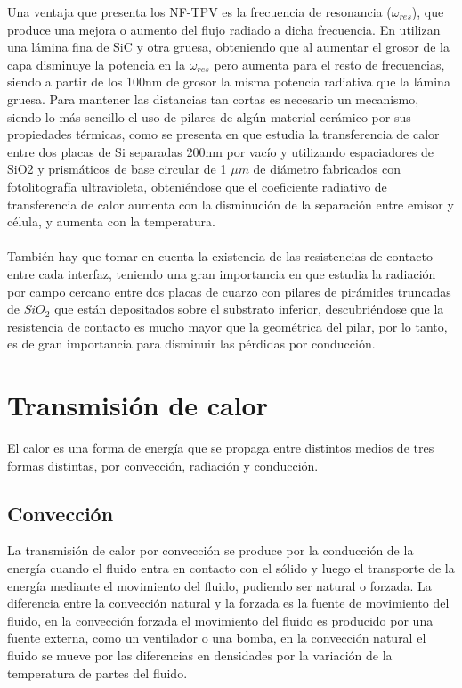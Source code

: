 Una ventaja que presenta los NF-TPV es la frecuencia de resonancia ($\omega_{res}$), que produce una mejora o aumento del flujo radiado a dicha frecuencia. En \cite{doi:Near_field_ThinFilm} utilizan una lámina fina de SiC y otra gruesa, obteniendo que al aumentar el grosor de la capa disminuye la potencia en la $\omega_{res}$ pero aumenta para el resto de frecuencias, siendo a partir de los 100nm de grosor la misma potencia radiativa que la lámina gruesa. Para mantener las distancias tan cortas es necesario un mecanismo, siendo lo más sencillo el uso de pilares de algún material cerámico por sus propiedades térmicas, como se presenta en \cite{NearField200} que estudia la transferencia de calor entre dos placas de Si separadas 200nm por vacío y utilizando espaciadores de SiO2 y prismáticos de base circular de 1 $\mu m$ de diámetro fabricados con fotolitografía ultravioleta, obteniéndose que el coeficiente radiativo de transferencia de calor aumenta con la disminución de la separación entre emisor y célula, y aumenta con la temperatura.\\\\
También hay que tomar en cuenta la existencia de las resistencias de contacto entre cada interfaz, teniendo una gran importancia en \cite{nf_TPV_Pillars_SiO2} que estudia la radiación por campo cercano entre dos placas de cuarzo con pilares de pirámides truncadas de $SiO_2$ que están depositados sobre el substrato inferior, descubriéndose que la resistencia de contacto es mucho mayor que la geométrica del pilar, por lo tanto, es de gran importancia para disminuir las pérdidas por conducción.\\


\section{Transmisión de calor}
El calor es una forma de energía que se propaga entre distintos medios de tres formas distintas, por convección, radiación y conducción.
\subsection{Convección}
La transmisión de calor por convección se produce por la conducción de la energía cuando el fluido entra en contacto con el sólido y luego el transporte de la energía mediante el movimiento del fluido, pudiendo ser natural o forzada. La diferencia entre la convección natural y la forzada es la fuente de movimiento del fluido, en la convección forzada el movimiento del fluido es producido por una fuente externa, como un ventilador o una bomba, en la convección natural el fluido se mueve por las diferencias en densidades por la variación de la temperatura de partes del fluido.\\
